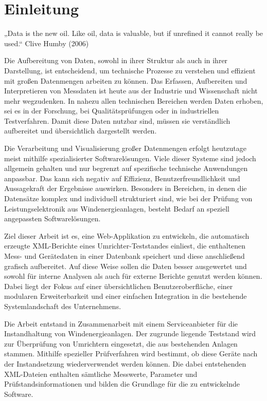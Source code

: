 


\newpage
\section{Einleitung}
\label{sec:einleitung}


„Data is the new oil. Like oil, data is valuable, but if unrefined it cannot really be used.“
Clive Humby (2006)

Die Aufbereitung von Daten, sowohl in ihrer Struktur als auch in ihrer Darstellung, ist entscheidend, um technische Prozesse zu verstehen und effizient mit großen Datenmengen arbeiten zu können.
Das Erfassen, Aufbereiten und Interpretieren von Messdaten ist heute aus der Industrie und Wissenschaft nicht mehr wegzudenken.
In nahezu allen technischen Bereichen werden Daten erhoben, sei es in der Forschung, bei Qualitätsprüfungen oder in industriellen Testverfahren.
Damit diese Daten nutzbar sind, müssen sie verständlich aufbereitet und übersichtlich dargestellt werden.

Die Verarbeitung und Visualisierung großer Datenmengen erfolgt heutzutage meist mithilfe spezialisierter Softwarelösungen.
Viele dieser Systeme sind jedoch allgemein gehalten und nur begrenzt auf spezifische technische Anwendungen anpassbar.
Das kann sich negativ auf Effizienz, Benutzerfreundlichkeit und Aussagekraft der Ergebnisse auswirken.
Besonders in Bereichen, in denen die Datensätze komplex und individuell strukturiert sind, wie bei der Prüfung von Leistungselektronik aus Windenergieanlagen, besteht Bedarf an speziell angepassten Softwarelösungen.

Ziel dieser Arbeit ist es, eine Web-Applikation zu entwickeln, die automatisch erzeugte XML-Berichte eines Umrichter-Teststandes einliest, die enthaltenen Mess- und Gerätedaten in einer Datenbank speichert und diese anschließend grafisch aufbereitet.
Auf diese Weise sollen die Daten besser ausgewertet und sowohl für interne Analysen als auch für externe Berichte genutzt werden können.
Dabei liegt der Fokus auf einer übersichtlichen Benutzeroberfläche, einer modularen Erweiterbarkeit und einer einfachen Integration in die bestehende Systemlandschaft des Unternehmens.

Die Arbeit entstand in Zusammenarbeit mit einem Serviceanbieter für die Instandhaltung von Windenergieanlagen.
Der zugrunde liegende Teststand wird zur Überprüfung von Umrichtern eingesetzt, die aus bestehenden Anlagen stammen.
Mithilfe spezieller Prüfverfahren wird bestimmt, ob diese Geräte nach der Instandsetzung wiederverwendet werden können.
Die dabei entstehenden XML-Dateien enthalten sämtliche Messwerte, Parameter und Prüfstandsinformationen und bilden die Grundlage für die zu entwickelnde Software.

